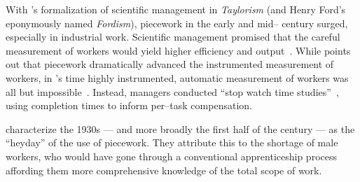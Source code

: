 \documentclass[trackingWork]{subfiles}
\begin{document}

{With \citeauthor{taylor1914principles}'s formalization of scientific management in \textit{Taylorism}
(and Henry Ford's eponymously named \textit{Fordism}),
piecework in the early and mid-- century surged, especially in industrial work.}
Scientific management promised that the careful measurement of workers would yield
higher efficiency and output~\cite{taylor1914principles,towardsGlobalFordism}.
While \citeauthor{Brown01041990} points out that
piecework dramatically advanced the instrumented measurement of workers,
in \citeauthor{taylor1914principles}'s time highly instrumented,
automatic measurement of workers was all but impossible~\cite{Brown01041990}.
Instead, managers conducted ``stop watch time studies''~\cite{nadworny1955scientific},
using completion times to inform per--task compensation.




\citeauthor{hart2013rise} characterize the 1930s
--- and more broadly the first half of the  century ---
as the ``heyday'' of the use of piecework.
They attribute this to the shortage of male workers,
who would have gone through a conventional apprenticeship process
affording them more comprehensive knowledge of the total scope of work.
\end{document}
